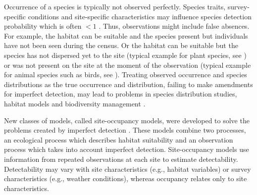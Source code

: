 \documentclass[a4paper, 12pt, leqno]{article}\usepackage[]{graphicx}\usepackage[]{color}
\begin{document}
Occurrence of a species is typically not observed perfectly. Species traits,
survey-specific conditions and site-specific characteristics may influence species
detection probability which is often $<1$ \citep{Chen2013}. Thus, observations might
include false absences. For example, the habitat can be suitable and the species present
but individuals have not been seen during the census. Or the habitat can be suitable but
the species has not dispersed yet to the site (typical example for plant species, see
\citet{Latimer2006}) or was not present on the site at the moment of the observation
(typical example for animal species such as birds, see \citet{Kery2005}). Treating
observed occurrence and species distributions as the true occurrence and distribution,
failing to make amendments for imperfect detection, may lead to problems in species
distribution studies, habitat models and biodiversity management
\citep{Latimer2006,Lahoz-Monfort2014,Kery2008}.

New classes of models, called site-occupancy models, were developed to solve the problems
created by imperfect detection \citep{MacKenzie2002}. These models combine two processes,
an ecological process which describes habitat suitability and an observation process which
takes into account imperfect detection. Site-occupancy models use information from
repeated observations at each site to estimate detectability. Detectability may vary with
site characteristics (e.g., habitat variables) or survey characteristics (e.g., weather
conditions), whereas occupancy relates only to site characteristics.
\end{document}
